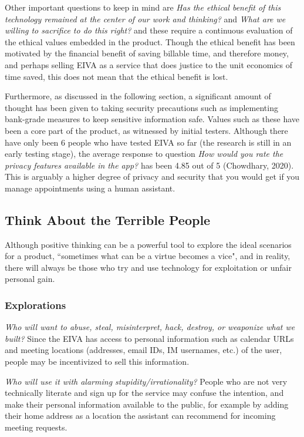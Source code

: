 \documentclass{article}
\begin{document}
Other important questions to keep in mind are \emph{Has the ethical benefit of this technology remained at the center of our work and thinking?} and \emph{What are we willing to sacrifice to do this right?} and these require a continuous evaluation of the ethical values embedded in the product. Though the ethical benefit has been motivated by the financial benefit of saving billable time, and therefore money, and perhaps selling EIVA as a service that does justice to the unit economics of time saved, this does not mean that the ethical benefit is lost.

Furthermore, as discussed in the following section, a significant amount of thought has been given to taking security precautions such as implementing bank-grade measures to keep sensitive information safe. Values such as these have been a core part of the product, as witnessed by initial testers. Although there have only been 6 people who have tested EIVA so far (the research is still in an early testing stage), the average response to question \emph{How would you rate the privacy features available in the app?} has been 4.85 out of 5 (Chowdhary, 2020). This is arguably a higher degree of privacy and security that you would get if you manage appointments using a human assistant.

\subsection{Think About the Terrible People}

Although positive thinking can be a powerful tool to explore the ideal scenarios for a product, ``sometimes what can be a virtue becomes a vice", and in reality, there will always be those who try and use technology for exploitation or unfair personal gain.

\subsubsection{Explorations}

\emph{Who will want to abuse, steal, misinterpret, hack, destroy, or weaponize what we built?} Since the EIVA has access to personal information such as calendar URLs and meeting locations (addresses, email IDs, IM usernames, etc.) of the user, people may be incentivized to sell this information.

\emph{Who will use it with alarming stupidity/irrationality?} People who are not very technically literate and sign up for the service may confuse the intention, and make their personal information available to the public, for example by adding their home address as a location the assistant can recommend for incoming meeting requests.
\end{document}
